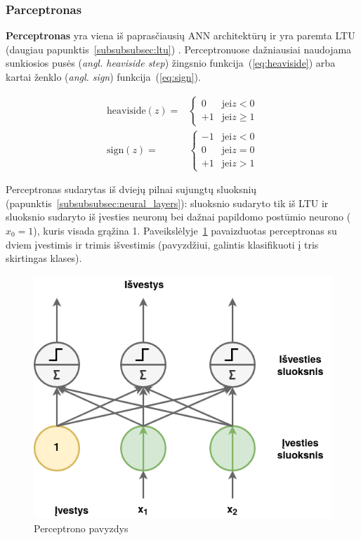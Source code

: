 \documentclass{VUMIFPSbakalaurinis}
\begin{document}
\subsubsection{Parceptronas}\label{subsubsec:perceptron}
{
	\textbf{Perceptronas} yra viena iš paprasčiausių ANN architektūrų ir yra paremta LTU (daugiau papunktis~\ref{subsubsubsec:ltu}) \cite{rosenblatt1957perceptron}. Perceptronuose dažniausiai naudojama sunkiosios pusės (\textit{angl. heaviside step}) žingsnio funkcija~(\ref{eq:heaviside}) arba kartai ženklo (\textit{angl. sign}) funkcija~(\ref{eq:sign}).
	
	\begin{align}
		\label{eq:heaviside}
		\textrm{heaviside} (z) = &
		\begin{cases} 
			0 & \textrm{jei} z < 0 \\ 
			+1 & \textrm{jei} z \geq 1 
		\end{cases} \\
		\label{eq:sign}
		\textrm{sign} (z) = &
		\begin{cases} 
			-1 & \textrm{jei} z < 0 \\ 
			0 & \textrm{jei} z = 0 \\ 
			+1 & \textrm{jei} z > 1 
		\end{cases}
	\end{align}
	
	Perceptronas sudarytas iš dviejų pilnai sujungtų sluoksnių (papunktis~\ref{subsubsubsec:neural_layers}): sluoksnio sudaryto tik iš LTU ir sluoksnio sudaryto iš įvesties neuronų bei dažnai papildomo postūmio neurono (\(x_0 = 1\)), kuris visada grąžina 1. Paveikslėlyje~\ref{img:perceptron} pavaizduotas perceptronas su dviem įvestimis ir trimis išvestimis (pavyzdžiui, galintis klasifikuoti į tris skirtingas klases).
	
	
	\begin{figure}[H]
		\centering
		\includegraphics[scale=0.33]{img/perceptron}
		\caption{Perceptrono pavyzdys}
		\label{img:perceptron}
	\end{figure} 
	
}
\end{document}
